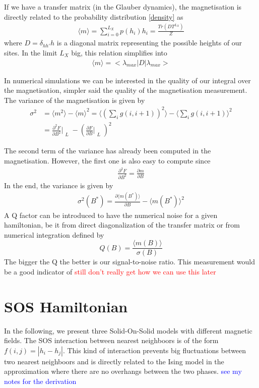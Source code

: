 If we have a transfer matrix (in the Glauber dynamics), the magnetisation is directly related to the probability distribution \ref{density} as 
\begin{align}
  \langle m\rangle = \sum_{i=0}^{L_X} p(h_i) h_i = \frac{Tr( D T^{L_X})}{Z}
\end{align}
where $D = \delta_{h h'} h $ is a diagonal matrix representing the possible heights of our sites.
In the limit $L_X$ big, this relation simplifies into 
\begin{align}
  \langle m\rangle = <\lambda_{max}|D|\lambda_{max}>
\end{align}

In numerical simulations we can be interested in the quality of our integral over the magnetisation, simpler said the quality of the magnetisation measurement. The variance of the magnetisation is given by
\begin{align}
  \sigma^2 &= \langle m^2\rangle-\langle m\rangle^2 = \langle (\sum_{i} g(i,i+1))^2 \rangle - \langle \sum_{i} g(i,i+1) \rangle^2 \\
  &= \frac{\partial^2 F}{\partial B^2} \Bigr|_{\substack{L}} - \left( \frac{\partial F}{\partial B} \Bigr|_{\substack{L}} \right) ^2
\end{align}

The second term of the variance has already been computed in the magnetisation. However, the first one is also easy to compute since
\begin{align}
  \frac{\partial^2 F}{\partial B^2} = \frac{\partial m}{\partial B}
\end{align}
In the end, the variance is given by
\begin{align}
  \sigma^2(B^\ast) = \frac{\partial \langle m(B^\ast)\rangle}{\partial B} - \langle m(B^\ast)\rangle^2
\end{align}
A Q factor can be introduced to have the numerical noise for a given hamiltonian, be it from direct diagonalization of the transfer matrix or from numerical integration defined by
\[ Q(B) = \frac{\langle m(B)\rangle}{\sigma(B)} \]
The bigger the Q the better is our signal-to-noise ratio. This measurement would be a good indicator of \textcolor{red}{still don't really get how we can use this later}
 
\newpage
\section{SOS Hamiltonian}

In the following, we present three Solid-On-Solid models with different magnetic fields. 
The SOS interaction between nearest neighboors is of the form $f(i,j) = |h_i - h_j|$. 
This kind of interaction prevents big fluctuations between two nearest neighboors and is directly related to the Ising model in the approximation where there are no overhangs between the two phases. \textcolor{blue}{see my notes for the derivation}


